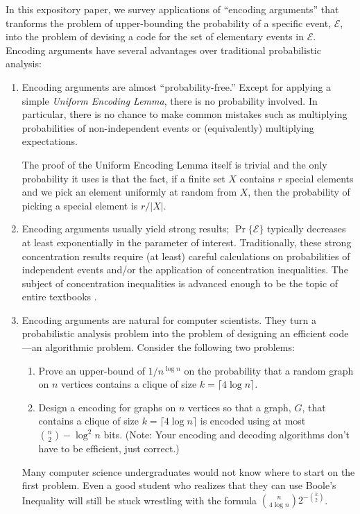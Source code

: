 \documentclass{patmorin}
\begin{document}
In this expository paper, we survey applications of ``encoding
arguments'' that tranforms the problem of upper-bounding the
probability of a specific event, $\mathcal{E}$, into the problem of
devising a code for the set of elementary events in $\mathcal{E}$.
Encoding arguments have several advantages over traditional
probabilistic analysis:

\begin{enumerate}
\item Encoding arguments are almost ``probability-free.''  Except for
  applying a simple \emph{Uniform Encoding Lemma}, there is no
  probability involved.  In particular, there is no chance to make
  common mistakes such as multiplying probabilities of non-independent
  events or (equivalently) multiplying expectations.

  The proof of the Uniform Encoding Lemma itself is trivial and the
  only probability it uses is that the fact, if a finite set $X$
  contains $r$ special elements and we pick an element uniformly at
  random from $X$, then the probability of picking a special element
  is $r/|X|$.

\item Encoding arguments usually yield strong results;
  $\Pr\{\mathcal{E}\}$ typically decreases at least exponentially in
  the parameter of interest. Traditionally, these strong concentration
  results require (at least) careful calculations on probabilities of
  independent events and/or the application of concentration
  inequalities.  The subject of concentration inequalities is advanced
  enough to be the topic of entire textbooks
  \cite{boucheron.lugosi.ea:concentration,dubhashi.panconesi:concentration}.
  
\item Encoding arguments are natural for computer scientists. They
  turn a probabilistic analysis problem into the problem of designing
  an efficient code---an algorithmic problem. Consider the following
  two problems:
  \begin{enumerate}

  \item Prove an upper-bound of $1/n^{\log n}$ on the probability that
    a random graph on $n$ vertices contains a clique of size
    $k=\lceil 4\log n\rceil$.

  \item Design a encoding for graphs on $n$ vertices so that a graph,
    $G$, that contains a clique of size $k=\lceil 4\log n\rceil$ is
    encoded using at most $\binom{n}{2}-\log^2 n$ bits. (Note: Your
    encoding and decoding algorithms don't have to be efficient, just
    correct.)
  \end{enumerate}
  Many computer science undergraduates would not know where to start
  on the first problem.  Even a good student who realizes that they
  can use Boole's Inequality will still be stuck wrestling with the
  formula $\binom{n}{4\log n}2^{-\binom{k}{2}}$.
\end{enumerate}
\end{document}
